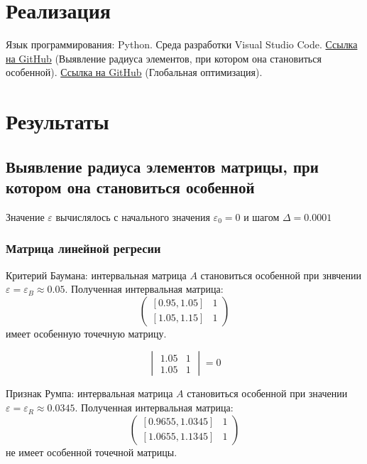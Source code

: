 \documentclass[a4paper,12pt]{article}
\begin{document}
    \section{Реализация}
    Язык программирования: Python. Среда разработки Visual Studio Code.
    \href{https://github.com/kirillkuks/IntervalAnalysis/tree/master/Lab1/Lab1}{Ссылка на GitHub}
    (Выявление радиуса элементов, при котором она становиться особенной).\newline
    \href{https://github.com/kirillkuks/IntervalAnalysis/tree/master/Lab1/Lab2}{Ссылка на GitHub}
    (Глобальная оптимизация).

    \section{Результаты}
    \subsection{Выявление радиуса элементов матрицы, при котором она становиться особенной}
    Значение $ \varepsilon $ вычислялось с начального значения $ \varepsilon_{0} = 0 $ и шагом $ \Delta = 0.0001 $

    \subsubsection{Матрица линейной регресии}
    Критерий Баумана: интервальная матрица \textbf{$ A $} становиться особенной при знвчении
    $ \varepsilon = \varepsilon_{B} \approx 0.05 $.
    Полученная интервальная матрица:
    \begin{equation}
        \begin{pmatrix}
            [0.95, 1.05] & 1\\
            [1.05, 1.15] & 1
        \end{pmatrix}
    \end{equation}
    имеет особенную точечную матрицу.

    \begin{equation}
        \begin{vmatrix}
            1.05 & 1\\
            1.05 & 1
        \end{vmatrix}
        = 0
    \end{equation}

    Признак Румпа: интервальная матрица \textbf{$ A $} становиться особенной при значении
    $ \varepsilon = \varepsilon_{R} \approx 0.0345 $.
    Полученная интервальная матрица:
    \begin{equation}
        \begin{pmatrix}
            [0.9655, 1.0345] & 1\\
            [1.0655, 1.1345] & 1
        \end{pmatrix}
    \end{equation}
    не имеет особенной точечной матрицы.
\end{document}
